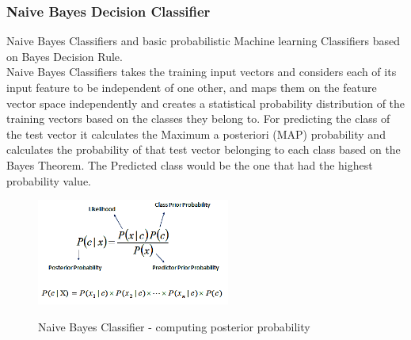 \documentclass[conference]{IEEEtran}
\begin{document}
\subsubsection{Naive Bayes Decision Classifier}
Naive Bayes Classifiers and basic probabilistic Machine learning Classifiers based on Bayes Decision Rule. \cite{stat_learning} \\
Naive Bayes Classifiers takes the training input vectors and considers each of its input feature to be independent of one other, and maps them on the feature vector space independently and creates a statistical probability distribution of the training vectors based on the classes they belong to. For predicting the class of the test vector it calculates the Maximum a posteriori (MAP) probability and calculates the probability of that test vector belonging to each class based on the Bayes Theorem. The Predicted class would be the one that had the highest probability value. 
\begin{figure}[htbp] %
\centering
\includegraphics[width=2.5in]{naive_bayes_icon.PNG}
\label{Naive Bayes classification mechanism}
\caption{Naive Bayes Classifier - computing posterior probability}
\end{figure}
\end{document}
